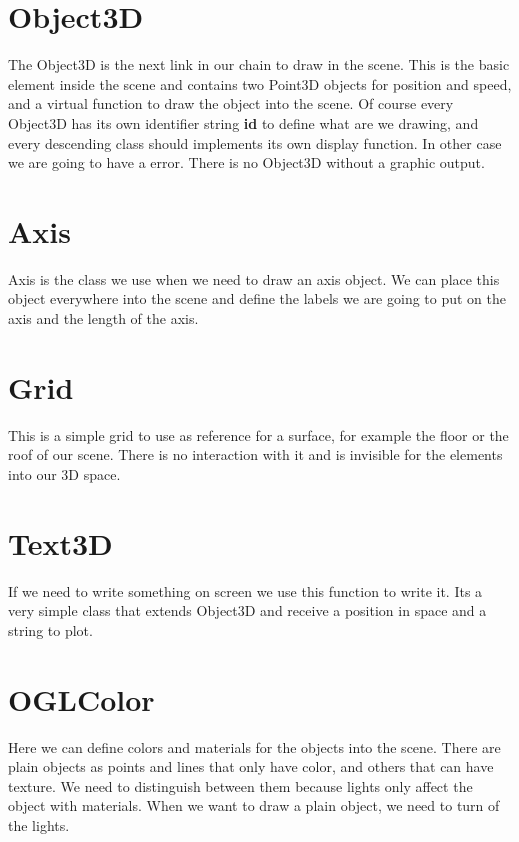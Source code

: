 \documentclass[12pt,a4paper,oneside,english]{book}
\begin{document}
\section{Object3D}

The Object3D is the next link in our chain to draw in the scene. This is the basic element inside the scene and contains two Point3D objects for position and speed, and a virtual function to draw the object into the scene. Of course every Object3D has its own identifier string \textbf{id} to define what are we drawing, and every descending class should implements its own display function. In other case we are going to have a error. There is no Object3D without a graphic output.

\section{Axis}

Axis is the class we use when we need to draw an axis object. We can place this object everywhere into the scene and define the labels we are going to put on the axis and the length of the axis.

\section{Grid}

This is a simple grid to use as reference for a surface, for example the floor or the roof of our scene. There is no interaction with it and is invisible for the elements into our 3D space.

\section{Text3D}

If we need to write something on screen we use this function to write it. Its a very simple class that extends Object3D and receive a position in space and a string to plot.

\section{OGLColor}

Here we can define colors and materials for the objects into the scene. There are plain objects as points and lines that only have color, and others that can have texture. We need to distinguish between them because lights only affect the object with materials. When we want to draw a plain object, we need to turn of the lights.
\end{document}
